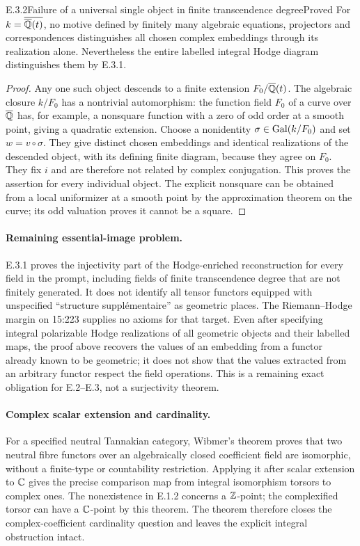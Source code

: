 \begin{result}{E.3.2}{Failure of a universal single object in finite transcendence degree}{Proved}
For $k=\overline{\overline{\mathbb Q}(t)}$, no motive defined by finitely many algebraic equations, projectors and correspondences distinguishes all chosen complex embeddings through its realization alone. Nevertheless the entire labelled integral Hodge diagram distinguishes them by E.3.1.
\end{result}
\begin{proof}
Any one such object descends to a finite extension $F_0/\overline{\mathbb Q}(t)$. The algebraic closure $k/F_0$ has a nontrivial automorphism: the function field $F_0$ of a curve over $\overline{\mathbb Q}$ has, for example, a nonsquare function with a zero of odd order at a smooth point, giving a quadratic extension. Choose a nonidentity $\sigma\in\operatorname{Gal}(k/F_0)$ and set $w=v\circ\sigma$. They give distinct chosen embeddings and identical realizations of the descended object, with its defining finite diagram, because they agree on $F_0$. They fix $i$ and are therefore not related by complex conjugation. This proves the assertion for every individual object. The explicit nonsquare can be obtained from a local uniformizer at a smooth point by the approximation theorem on the curve; its odd valuation proves it cannot be a square.
\end{proof}

\paragraph{Remaining essential-image problem.}
E.3.1 proves the injectivity part of the Hodge-enriched reconstruction for every field in the prompt, including fields of finite transcendence degree that are not finitely generated. It does not identify all tensor functors equipped with unspecified ``structure suppl\'ementaire'' as geometric places. The Riemann--Hodge margin on 15:223 supplies no axioms for that target. Even after specifying integral polarizable Hodge realizations of all geometric objects and their labelled maps, the proof above recovers the values of an embedding from a functor already known to be geometric; it does not show that the values extracted from an arbitrary functor respect the field operations. This is a remaining exact obligation for E.2--E.3, not a surjectivity theorem.

\paragraph{Complex scalar extension and cardinality.}
For a specified neutral Tannakian category, Wibmer's theorem \cite[Theorems 1.1--1.2]{Wibmer2025} proves that two neutral fibre functors over an algebraically closed coefficient field are isomorphic, without a finite-type or countability restriction. Applying it after scalar extension to $\mathbb C$ gives the precise comparison map from integral isomorphism torsors to complex ones. The nonexistence in E.1.2 concerns a $\mathbb Z$-point; the complexified torsor can have a $\mathbb C$-point by this theorem. The theorem therefore closes the complex-coefficient cardinality question and leaves the explicit integral obstruction intact.
